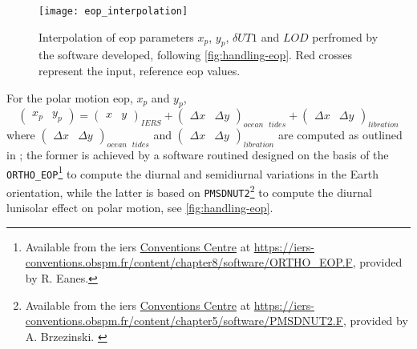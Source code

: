 \begin{figure}
    \centering
    \texttt{[image: eop\_interpolation]}
    \caption{Interpolation of \gls{eop} parameters $x_p$, $y_p$, $\delta UT1$ and $LOD$ 
        perfromed by the software developed, following \ref{fig:handling-eop}. Red crosses 
        represent the input, reference \gls{eop} values.}
    \label{fig:eop-interpolation-results}
  \end{figure}

For the polar motion \gls{eop}, $x_p$ and $y_p$,
\begin{equation}
    \begin{pmatrix} x_p & y_p \end{pmatrix} = 
    \begin{pmatrix} x & y \end{pmatrix}_{IERS} + 
    \begin{pmatrix} \Delta x & \Delta y \end{pmatrix}_{ocean\text{ }tides} + 
    \begin{pmatrix} \Delta x & \Delta y \end{pmatrix}_{libration} 
\end{equation}
where $\begin{pmatrix} \Delta x & \Delta y \end{pmatrix}_{ocean\text{ }tides}$ 
and $\begin{pmatrix} \Delta x & \Delta y \end{pmatrix}_{libration}$ are computed as 
outlined in \cite{iers2010}; the former is achieved by a software routined designed 
on the basis of the \texttt{ORTHO\_EOP}\footnote{Available from the \gls{iers} \href{https://iers-conventions.obspm.fr/}{Conventions Centre} at \url{https://iers-conventions.obspm.fr/content/chapter8/software/ORTHO_EOP.F}, provided by R. Eanes.\label{fn:ortho-eop-f}} 
to compute the diurnal and semidiurnal variations in the Earth orientation, while the latter 
is based on \texttt{PMSDNUT2}\footnote{Available from the \gls{iers} \href{https://iers-conventions.obspm.fr/}{Conventions Centre} at \url{https://iers-conventions.obspm.fr/content/chapter5/software/PMSDNUT2.F}, provided by A. Brzezinski. \label{fn:pmsdnut2-f}}
to compute the diurnal lunisolar effect on polar motion, see \ref{fig:handling-eop}.

